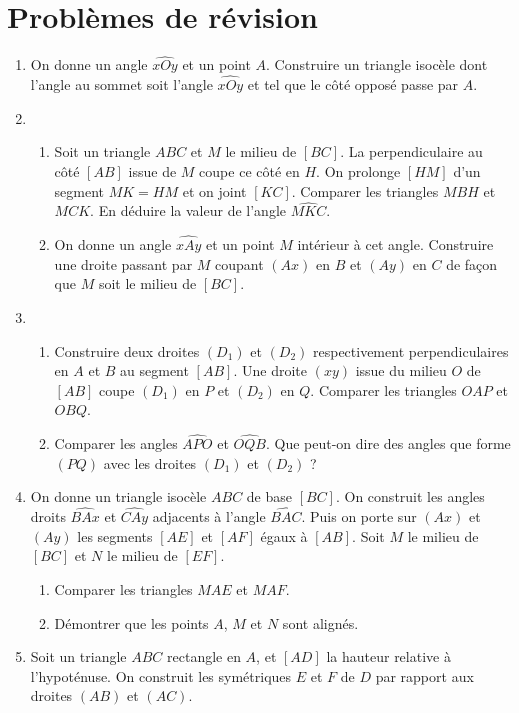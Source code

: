 
\chapter*{Problèmes de révision } 
 \begin{enumerate}
 \item On donne un angle $\widehat{xOy}$ et un point $A$. Construire un triangle isocèle dont l'angle au sommet soit l'angle $\widehat{xOy}$ et tel que le côté opposé passe par $A$. 
 \item \begin{enumerate}
 \item Soit un triangle $ABC$ et $M$ le milieu de $[BC]$. La perpendiculaire au côté $[AB]$ issue de $M$ coupe ce côté en $H$. On prolonge $[HM]$ d'un segment $MK=HM$
 et on joint $[KC]$. Comparer les triangles $MBH$ et $MCK$. En déduire la valeur de l'angle $\widehat{MKC}$. 
 \item On donne un angle $\widehat{xAy}$ et un point $M$ intérieur à cet angle. Construire une droite passant par $M$ coupant $(Ax)$ en $B$ et $(Ay)$ en $C$ de façon que $M$ soit le milieu de $[BC]$. 
 \end{enumerate}
 \item \begin{enumerate}
 \item Construire deux droites $(D_1)$ et $(D_2)$ respectivement perpendiculaires
 en $A$ et $B$ au segment $[AB]$. Une droite $(xy)$ issue du milieu $O$ de $[AB]$ coupe $(D_1)$ en $P$ et $(D_2)$ en $Q$. Comparer les triangles $OAP$ et $OBQ$.
 \item Comparer les angles $\widehat{APO}$ et $\widehat{OQB}$. Que peut-on dire des angles que forme $(PQ)$ avec les droites $(D_1)$ et $(D_2)$ ?
 \end{enumerate}
 \item On donne un triangle isocèle $ABC$ de base $[BC]$. On construit les angles droits $\widehat{BAx}$ et $\widehat{CAy}$ adjacents à l'angle $\widehat{BAC}$. 
 Puis on porte sur $(Ax)$ et $(Ay)$ les segments $[AE]$ et $[AF]$ égaux à $[AB]$.
 Soit $M$ le milieu de $[BC]$ et $N$ le milieu de $[EF]$. \begin{enumerate}
 \item Comparer les triangles $MAE$ et $MAF$.
 \item Démontrer que les points $A$, $M$ et $N$ sont alignés.
 \end{enumerate}
 \item Soit un triangle $ABC$ rectangle en $A$, et $[AD]$ la hauteur relative à l'hypoténuse. On construit les symétriques $E$ et $F$ de $D$ par rapport aux droites $(AB)$ et $(AC)$.\begin{enumerate}

\end{enumerate}
\end{enumerate}

